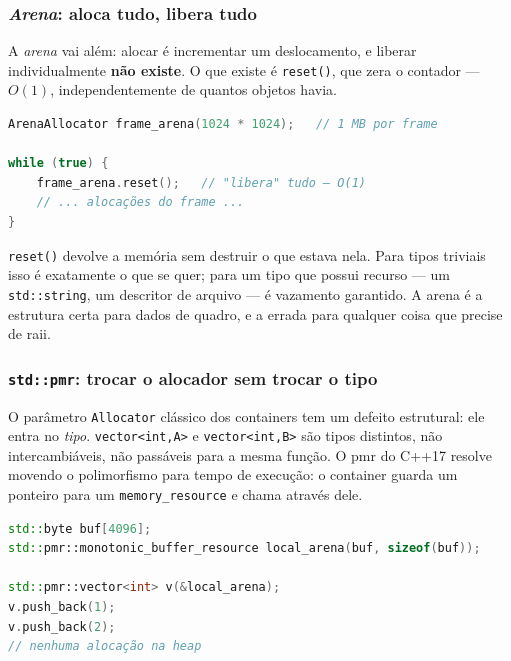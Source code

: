 \subsubsection{\emph{Arena}: aloca tudo, libera tudo}

A \emph{arena} vai além: alocar é incrementar um deslocamento, e liberar
individualmente \textbf{não existe}. O que existe é \texttt{reset()}, que zera o
contador --- $O(1)$, independentemente de quantos objetos havia.

\begin{lstlisting}[style=bt, language=C++,
    caption={O uso clássico da arena: memória com escopo de quadro.}]
ArenaAllocator frame_arena(1024 * 1024);   // 1 MB por frame

while (true) {
    frame_arena.reset();   // "libera" tudo — O(1)
    // ... alocações do frame ...
}
\end{lstlisting}

\begin{armadilha}
\texttt{reset()} devolve a memória sem destruir o que estava nela. Para tipos
triviais isso é exatamente o que se quer; para um tipo que possui recurso ---
um \texttt{std::string}, um descritor de arquivo --- é vazamento garantido. A
arena é a estrutura certa para dados de quadro, e a errada para qualquer coisa
que precise de \gls{raii}.
\end{armadilha}

\subsubsection{\texttt{std::pmr}: trocar o alocador sem trocar o tipo}

O parâmetro \texttt{Allocator} clássico dos containers tem um defeito estrutural:
ele entra no \emph{tipo}. \texttt{vector<int,A>} e \texttt{vector<int,B>} são
tipos distintos, não intercambiáveis, não passáveis para a mesma função. O
\gls{pmr} do C++17 resolve movendo o polimorfismo para tempo de execução: o
container guarda um ponteiro para um \texttt{memory\_resource} e chama através
dele.

\begin{lstlisting}[style=bt, language=C++,
    caption={Um \texttt{vector} que aloca na pilha.}]
std::byte buf[4096];
std::pmr::monotonic_buffer_resource local_arena(buf, sizeof(buf));

std::pmr::vector<int> v(&local_arena);
v.push_back(1);
v.push_back(2);
// nenhuma alocação na heap
\end{lstlisting}

